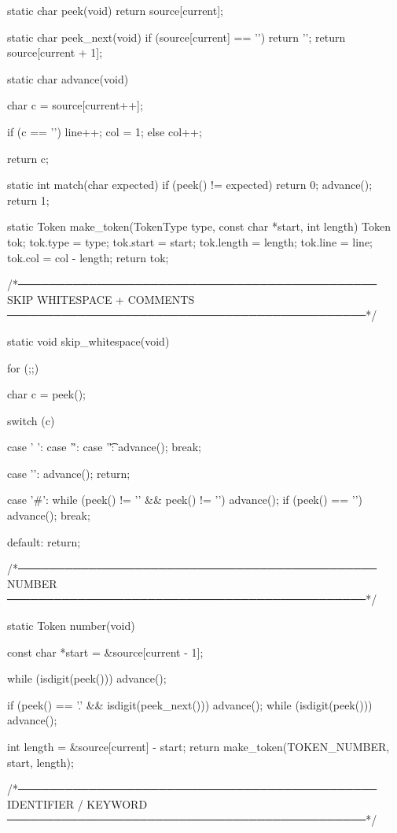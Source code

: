 \documentclass{article}
\begin{document}
static char peek(void)
{
    return source[current];
}

static char peek_next(void)
{
    if (source[current] == '\0') return '\0';
    return source[current + 1];
}

static char advance(void)
{
    char c = source[current++];

    if (c == '\n') {
        line++;
        col = 1;
    } else {
        col++;
    }

    return c;
}

static int match(char expected)
{
    if (peek() != expected) return 0;
    advance();
    return 1;
}

static Token make_token(TokenType type, const char *start, int length)
{
    Token tok;
    tok.type   = type;
    tok.start  = start;
    tok.length = length;
    tok.line   = line;
    tok.col    = col - length;
    return tok;
}

/*──────────────────────────────────────────────
  SKIP WHITESPACE + COMMENTS
──────────────────────────────────────────────*/

static void skip_whitespace(void)
{
    for (;;) {
        char c = peek();

        switch (c) {

            case ' ':
            case '\r':
            case '\t':
                advance();
                break;

            case '\n':
                advance();
                return;

            case '#':
                while (peek() != '\n' && peek() != '\0') {
                    advance();
                }
                if (peek() == '\n') advance();
                break;

            default:
                return;
        }
    }
}

/*──────────────────────────────────────────────
  NUMBER
──────────────────────────────────────────────*/

static Token number(void)
{
    const char *start = &source[current - 1];

    while (isdigit(peek()))
        advance();

    if (peek() == '.' && isdigit(peek_next())) {
        advance();
        while (isdigit(peek()))
            advance();
    }

    int length = &source[current] - start;
    return make_token(TOKEN_NUMBER, start, length);
}

/*──────────────────────────────────────────────
  IDENTIFIER / KEYWORD
──────────────────────────────────────────────*/
\end{document}

